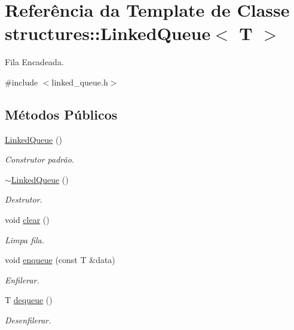\hypertarget{classstructures_1_1LinkedQueue}{}\section{Referência da Template de Classe structures\+:\+:Linked\+Queue$<$ T $>$}
\label{classstructures_1_1LinkedQueue}


Fila Encadeada.  




{\ttfamily \#include $<$linked\+\_\+queue.\+h$>$}

\subsection*{Métodos Públicos}
\begin{DoxyCompactItemize}
\item 
\hyperlink{classstructures_1_1LinkedQueue_aae2a207f04610f5bb460de8b4f5c7650}{Linked\+Queue} ()
\begin{DoxyCompactList}\small\item\em Construtor padrão. \end{DoxyCompactList}\item 
\hyperlink{classstructures_1_1LinkedQueue_ad3f70a9465ecbf8868ad9206e2b01711}{$\sim$\+Linked\+Queue} ()
\begin{DoxyCompactList}\small\item\em Destrutor. \end{DoxyCompactList}\item 
void \hyperlink{classstructures_1_1LinkedQueue_a67dfb58a8feb96abccbd20862767e981}{clear} ()
\begin{DoxyCompactList}\small\item\em Limpa fila. \end{DoxyCompactList}\item 
void \hyperlink{classstructures_1_1LinkedQueue_a6e9d6e444c5d534d01736bb82c34c815}{enqueue} (const T \&data)
\begin{DoxyCompactList}\small\item\em Enfilerar. \end{DoxyCompactList}\item 
T \hyperlink{classstructures_1_1LinkedQueue_af6037408a07637554b8a8be7201a756d}{dequeue} ()
\begin{DoxyCompactList}\small\item\em Desenfilerar. \end{DoxyCompactList}\item 

\end{DoxyCompactItemize}
